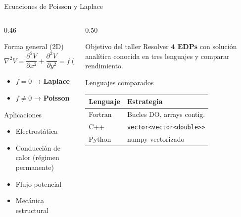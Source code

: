 \documentclass[aspectratio=169, 11pt]{beamer}
\begin{document}
\begin{frame}{Ecuaciones de Poisson y Laplace}
  \begin{columns}[T]
    \begin{column}{0.46\textwidth}
      \begin{block}{Forma general (2D)}
        \[
          \nabla^2 V =
          \frac{\partial^2 V}{\partial x^2} +
          \frac{\partial^2 V}{\partial y^2} = f(x,y)
        \]
        \begin{itemize}
          \item $f=0$ \;\;→\; \textbf{Laplace}
          \item $f\neq0$ \;→\; \textbf{Poisson}
        \end{itemize}
      \end{block}
      \vspace{0.3cm}
      \begin{exampleblock}{Aplicaciones}
        \begin{itemize}
          \item Electrostática
          \item Conducción de calor (régimen permanente)
          \item Flujo potencial
          \item Mecánica estructural
        \end{itemize}
      \end{exampleblock}
    \end{column}
    \begin{column}{0.50\textwidth}
      \begin{alertblock}{Objetivo del taller}
        Resolver \textbf{4 EDPs} con solución analítica conocida
        en tres lenguajes y comparar rendimiento.
      \end{alertblock}
      \vspace{0.3cm}
      \begin{block}{Lenguajes comparados}
        \begin{tabular}{ll}
          \toprule
          \textbf{Lenguaje} & \textbf{Estrategia} \\
          \midrule
          Fortran & Bucles DO, arrays contig. \\
          C++     & \texttt{vector<vector<double>>} \\
          Python  & numpy vectorizado \\
          \bottomrule
        \end{tabular}
      \end{block}
    \end{column}
  \end{columns}
\end{frame}
\end{document}
